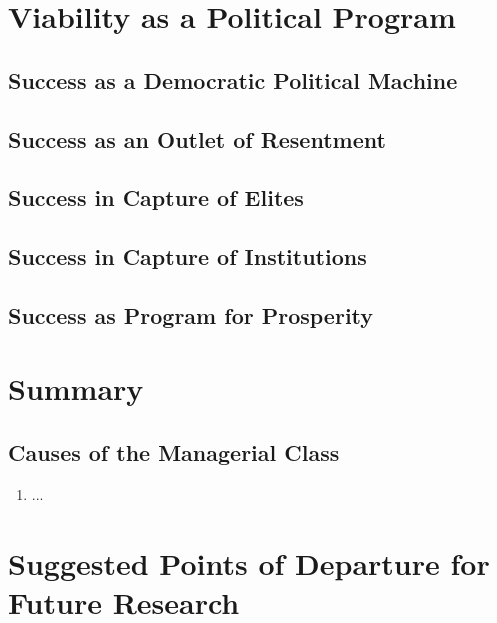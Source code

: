 \documentclass[12pt]{article}
\begin{document}
\section{Viability as a Political Program}
\subsection{Success as a Democratic Political Machine}
\subsection{Success as an Outlet of Resentment}
\subsection{Success in Capture of Elites}
\subsection{Success in Capture of Institutions}
\subsection{Success as Program for Prosperity}

\section{Summary}

\subsection{Causes of the Managerial Class}
\begin{enumerate}
    \item ...
\end{enumerate}

\section{Suggested Points of Departure for Future Research}
\end{document}
